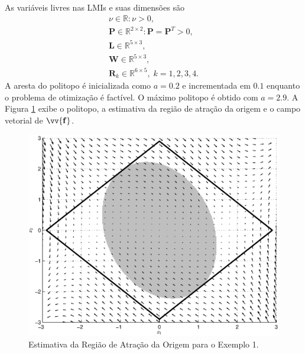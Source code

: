 \documentclass{ppgeesa}
\newcommand*{\Bold}[1]{\boldsymbol{\mathbf{#1}}}
\newcommand*{\Matr}[1]{\Bold{#1}}
\newcommand*{\Vect}[1]{\vv{\Bold{#1}}}
\begin{document}
As variáveis livres nas LMIs e suas dimensões são
\begin{gather}
  \nu \in \mathbb{R} \colon \nu > 0
  ,\\
  \Matr{P} \in \mathbb{R}^{2 \times 2} \colon \Matr{P} = \Matr{P}^T > 0
  ,\\
  \Matr{L} \in \mathbb{R}^{5 \times 3}
  ,\\
  \Matr{W} \in \mathbb{R}^{5 \times 3}
  ,\\
  \Matr{R}_k \in \mathbb{R}^{6 \times 5}
  ,\; k = 1, 2, 3, 4
  .
\end{gather}
A aresta do politopo é inicializada como $a = \num{0.2}$ e incrementada em $\num{0.1}$ enquanto o problema de otimização é factível.
O máximo politopo é obtido com $a = \num{2.9}$.
A Figura \ref{fig:rao1} exibe o politopo, a estimativa da região de atração da origem e o campo vetorial de $\Vect{f}$.

\begin{figure}[h]
  \centering
  \includegraphics[width=0.95\linewidth]{exemplo1_28.eps}
  \caption{Estimativa da Região de Atração da Origem para o Exemplo 1.}
  \label{fig:rao1}
\end{figure}
\end{document}
